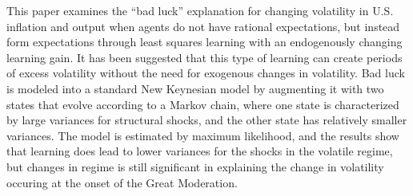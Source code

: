 This paper examines the ``bad luck'' explanation for changing volatility in U.S. inflation and output when agents do not have rational expectations, but instead form expectations through least squares learning with an endogenously changing learning gain.  It has been suggested that this type of learning can create periods of excess volatility without the need for exogenous changes in volatility.  Bad luck is modeled into a standard New Keynesian model by augmenting it with two states that evolve according to a Markov chain, where one state is characterized by large variances for structural shocks, and the other state has relatively smaller variances.  The model is estimated by maximum likelihood, and the results show that learning does lead to lower variances for the shocks in the volatile regime, but changes in regime is still significant in explaining the change in volatility occuring at the onset of the Great Moderation.
